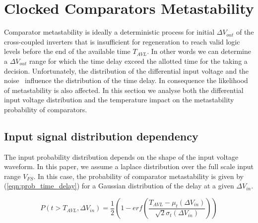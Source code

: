 
\chapter{Clocked Comparators Metastability}
\label{app:comp-metastability}

Comparator metastability is ideally a deterministic process for initial $\Delta V_{out}$ of the cross-coupled inverters that is insufficient for regeneration to reach valid logic levels before the end of the available time $T_{AVL}$. In other words we can determine a $\Delta V_{out}$ range for which the time delay exceed the allotted time for the taking a decision.
  Unfortunately, the distribution of the differential input voltage and the noise~\cite{noise_comp_sepke_2009} influence the distribution of the time delay. In consequence the likelihood of metastability is also affected. In this section we analyse both the differential input voltage distribution and the temperature impact on the metastability probability of comparators.

\section{Input signal distribution dependency}
The input probability distribution depends on the shape of the input voltage waveform. In this paper, we assume a laplace distribution over the full scale input range $V_{FS}$. In this case, the probability of comparator metastability is given by (\ref{eqn:prob_time_delay}) for a Gaussian distribution of the delay at a given $\Delta V_{in}$.


\begin{equation}
P(t > T_{AVL}, \Delta V_{in}) = \frac{1}{2}\left(1-erf\left(\frac{T_{AVL}-\mu_{t}(\Delta V_{in})}{\sqrt{2}\sigma_{t}(\Delta V_{in})}\right)\right)
\label{eqn:prob_time_delay}
\end{equation}

